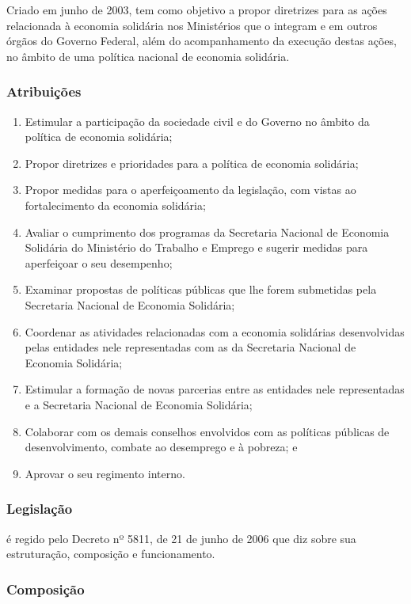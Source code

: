 Criado em junho de 2003, tem como objetivo a propor diretrizes para as
ações relacionada à economia solidária nos Ministérios que
o integram e em outros órgãos do Governo Federal, além do
acompanhamento da execução destas ações, no âmbito de uma
política nacional de economia solidária.

\subsubsection*{Atribuições}

\begin{enumerate}
\item 
Estimular a participação da sociedade civil e do Governo no
âmbito da política de economia solidária;
\item 
Propor diretrizes e prioridades para a política de economia
solidária;
\item 
Propor medidas para o aperfeiçoamento da legislação, com
vistas ao fortalecimento da economia solidária;
\item 
Avaliar o cumprimento dos programas da Secretaria Nacional de Economia
Solidária do Ministério do Trabalho e Emprego e sugerir medidas
para aperfeiçoar o seu desempenho;
\item 
Examinar propostas de políticas públicas que lhe forem submetidas
pela Secretaria Nacional de Economia Solidária;
\item 
Coordenar as atividades relacionadas com a economia solidárias
desenvolvidas pelas entidades nele representadas com as da Secretaria
Nacional de Economia Solidária;
\item 
Estimular a formação de novas parcerias entre as entidades nele
representadas e a Secretaria Nacional de Economia Solidária;
\item 
Colaborar com os demais conselhos envolvidos com as políticas
públicas de desenvolvimento, combate ao desemprego e à pobreza; e
\item 
Aprovar o seu regimento interno.
\end{enumerate}

\subsubsection*{Legislação}

é regido pelo Decreto nº 5811, de 21 de junho de
2006 que diz sobre sua estruturação, composição e
funcionamento.

\subsubsection*{Composição}

